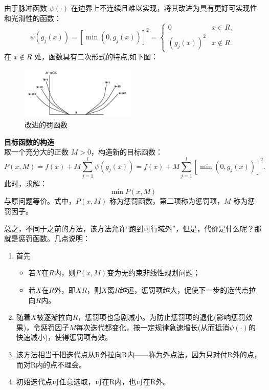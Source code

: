     由于脉冲函数 \(\psi(\cdot)\) 在边界上不连续且难以实现，将其改进为具有更好可实现性和光滑性的函数：
    \[
    \psi(g_j(x)) = [\min(0, g_j(x))]^2 = 
    \begin{cases} 
        0 & x \in R, \\ 
        (g_j(x))^2 & x \notin R.
    \end{cases}
    \]
    在 \( x \notin R \) 处，函数具有二次形式的特点,如下图：
    \begin{figure}[H]
        \centering
        \includegraphics[width=0.5\textwidth]{./image/25.png}
        \caption{改进的罚函数}
        \label{fig:Chapter4_Temporary_Pavilion_1}
    \end{figure}
    \begin{notebox}{\textbf{目标函数的构造}}{}
    \\取一个充分大的正数 \( M > 0 \)，构造新的目标函数：
    \[
    P(x, M) = f(x) + M \sum_{j=1}^{l} \psi(g_j(x)) = f(x) + M \sum_{j=1}^{l} [\min(0, g_j(x))]^2.
    \]
    此时，求解：
    \[
    \min P(x, M)
    \]
    与原问题等价。式中，\( P(x, M) \) 称为惩罚函数，第二项称为惩罚项，\( M \) 称为惩罚因子。
    \end{notebox}
    总之，不同于之前的方法，该方法允许“跑到可行域外”，但是，代价是什么呢？那就是惩罚函数。几点说明：
    \begin{enumerate}
    \item 首先
    \begin{itemize}
        \item 若$X$在$R$内，则$P(x,M)$变为无约束非线性规划问题；
        \item 若$X$在$R$外，即$XR$，则$X$离$R$越远，惩罚项越大，促使下一步的选代点拉向$R$内。 
    \end{itemize}
    \item 随着$X$被逐渐拉向$R$，惩罚项也急剧减小。为防止惩罚项的退化(影响惩罚效果)，令惩罚因子$M$每次迭代都变化，按一定规律急速增长(从而抵消$\psi(\cdot)$的快速减小)，使得惩罚项有效。
    \item 该方法相当于把迭代点从R外拉向R内——称为外点法，因为只对付R外的点，而对R内的点不理会。
    \item 初始迭代点可任意选取，可在R内，也可在R外。
\end{enumerate}
